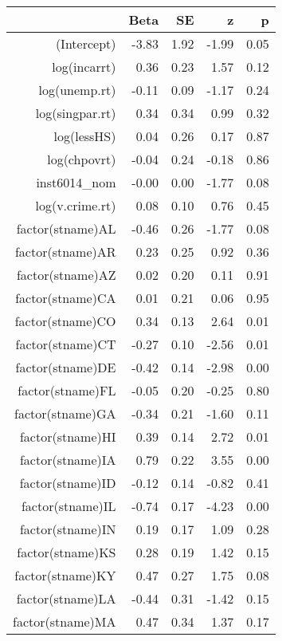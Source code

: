 \begin{table}[ht]
\centering
\begin{tabular}{rrrrr}
  \hline
 & Beta & SE & z & p \\ 
  \hline
(Intercept) & -3.83 & 1.92 & -1.99 & 0.05 \\ 
  log(incarrt) & 0.36 & 0.23 & 1.57 & 0.12 \\ 
  log(unemp.rt) & -0.11 & 0.09 & -1.17 & 0.24 \\ 
  log(singpar.rt) & 0.34 & 0.34 & 0.99 & 0.32 \\ 
  log(lessHS) & 0.04 & 0.26 & 0.17 & 0.87 \\ 
  log(chpovrt) & -0.04 & 0.24 & -0.18 & 0.86 \\ 
  inst6014\_nom & -0.00 & 0.00 & -1.77 & 0.08 \\ 
  log(v.crime.rt) & 0.08 & 0.10 & 0.76 & 0.45 \\ 
  factor(stname)AL & -0.46 & 0.26 & -1.77 & 0.08 \\ 
  factor(stname)AR & 0.23 & 0.25 & 0.92 & 0.36 \\ 
  factor(stname)AZ & 0.02 & 0.20 & 0.11 & 0.91 \\ 
  factor(stname)CA & 0.01 & 0.21 & 0.06 & 0.95 \\ 
  factor(stname)CO & 0.34 & 0.13 & 2.64 & 0.01 \\ 
  factor(stname)CT & -0.27 & 0.10 & -2.56 & 0.01 \\ 
  factor(stname)DE & -0.42 & 0.14 & -2.98 & 0.00 \\ 
  factor(stname)FL & -0.05 & 0.20 & -0.25 & 0.80 \\ 
  factor(stname)GA & -0.34 & 0.21 & -1.60 & 0.11 \\ 
  factor(stname)HI & 0.39 & 0.14 & 2.72 & 0.01 \\ 
  factor(stname)IA & 0.79 & 0.22 & 3.55 & 0.00 \\ 
  factor(stname)ID & -0.12 & 0.14 & -0.82 & 0.41 \\ 
  factor(stname)IL & -0.74 & 0.17 & -4.23 & 0.00 \\ 
  factor(stname)IN & 0.19 & 0.17 & 1.09 & 0.28 \\ 
  factor(stname)KS & 0.28 & 0.19 & 1.42 & 0.15 \\ 
  factor(stname)KY & 0.47 & 0.27 & 1.75 & 0.08 \\ 
  factor(stname)LA & -0.44 & 0.31 & -1.42 & 0.15 \\ 
  factor(stname)MA & 0.47 & 0.34 & 1.37 & 0.17 \\ 

\end{tabular}
\end{table}
